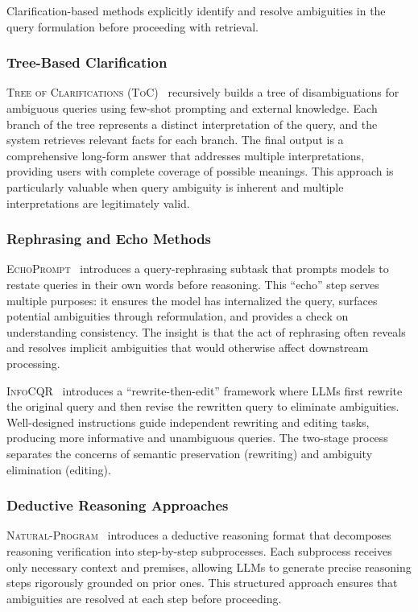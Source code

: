 \documentclass{article}
\begin{document}
Clarification-based methods explicitly identify and resolve ambiguities in the query formulation before proceeding with retrieval.

\subsubsection{Tree-Based Clarification}

\textsc{Tree of Clarifications (ToC)}~\citep{ToC} recursively builds a tree of disambiguations for ambiguous queries using few-shot prompting and external knowledge. Each branch of the tree represents a distinct interpretation of the query, and the system retrieves relevant facts for each branch. The final output is a comprehensive long-form answer that addresses multiple interpretations, providing users with complete coverage of possible meanings. This approach is particularly valuable when query ambiguity is inherent and multiple interpretations are legitimately valid.

\subsubsection{Rephrasing and Echo Methods}

\textsc{EchoPrompt}~\citep{EchoPrompt} introduces a query-rephrasing subtask that prompts models to restate queries in their own words before reasoning. This ``echo'' step serves multiple purposes: it ensures the model has internalized the query, surfaces potential ambiguities through reformulation, and provides a check on understanding consistency. The insight is that the act of rephrasing often reveals and resolves implicit ambiguities that would otherwise affect downstream processing.

\textsc{InfoCQR}~\citep{InfoCQR} introduces a ``rewrite-then-edit'' framework where LLMs first rewrite the original query and then revise the rewritten query to eliminate ambiguities. Well-designed instructions guide independent rewriting and editing tasks, producing more informative and unambiguous queries. The two-stage process separates the concerns of semantic preservation (rewriting) and ambiguity elimination (editing).

\subsubsection{Deductive Reasoning Approaches}

\textsc{Natural-Program}~\citep{Natural-Program} introduces a deductive reasoning format that decomposes reasoning verification into step-by-step subprocesses. Each subprocess receives only necessary context and premises, allowing LLMs to generate precise reasoning steps rigorously grounded on prior ones. This structured approach ensures that ambiguities are resolved at each step before proceeding.
\end{document}
